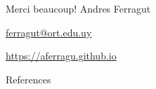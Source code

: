 \documentclass[aspectratio=169]{beamer}
\begin{document}
\begin{frame}[plain]
	\vfill
	{\Huge \alert{Merci beaucoup!}}
	\vfill
	Andres Ferragut

	\smallskip

	\href{mailto://ferragut@ort.edu.uy}{\alert{ferragut@ort.edu.uy}}
	
	\smallskip

	\href{http://aferragu.github.io}{\alert{https://aferragu.github.io}}
\end{frame}

\begin{frame}[allowframebreaks]{References}
	
\end{frame}
\end{document}
